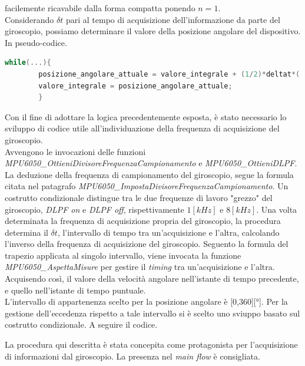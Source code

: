 \documentclass[11pt]{report}
\begin{document}
facilemente ricavabile dalla forma compatta ponendo $n=1$.\\
Considerando $\delta t$ pari al tempo di acquisizione dell'informazione da parte del giroscopio, possiamo determinare il valore della posizione angolare del dispositivo.\\
In pseudo-codice.
\begin{lstlisting}[language = Cpp]
    while(...){
        posizione_angolare_attuale = valore_integrale + (1/2)*deltat*( vel_ang_ist_prec + vel_ang_ist_att);
        valore_integrale = posizione_angolare_attuale;
        }
\end{lstlisting}
Con il fine di adottare la logica precedentemente esposta, è stato necessario lo sviluppo di codice utile all'individuazione della frequenza di acquisizione del giroscopio.\\
Avvengono le invocazioni delle funzioni \textit{MPU6050\_OttieniDivisoreFrequenzaCampionamento} e \textit{MPU6050\_OttieniDLPF}.\\
La deduzione della frequenza di campionamento del giroscopio, segue la formula citata nel patagrafo \textit{MPU6050\_ImpostaDivisoreFrequenzaCampionamento}. %
Un costrutto condizionale distingue tra le due frequenze di lavoro "grezzo" del giroscopio, \textit{DLPF on} e \textit{DLPF off}, rispettivamente $1 [kHz]$ e $8 [kHz]$.
Una volta determinata la frequenza di acquisizione propria del giroscopio, la procedura determina il $\delta t$, l'intervallo di tempo tra un'acquisizione e l'altra, calcolando l'inverso della frequenza di acquisizione del giroscopio.
Seguento la formula del trapezio applicata al singolo intervallo, viene invocata la funzione \textit{MPU6050\_AspettaMisure} per gestire il \textit{timing} tra un'acquisizione e l'altra. Acquisendo così, il valore della velocità angolare nell'istante di tempo precedente, e quello nell'istante di tempo puntuale.\\
L'intervallo di appartenenza scelto per la posizione angolare è [0,360][°]. Per la gestione dell'eccedenza rispetto a tale intervallo si è scelto uno sviuppo basato sul costrutto condizionale.
A seguire il codice.

La procedura qui descritta è stata concepita come protagonista per l'acquisizione di informazioni dal giroscopio. La presenza nel \textit{main flow} è consigliata.
\end{document}
